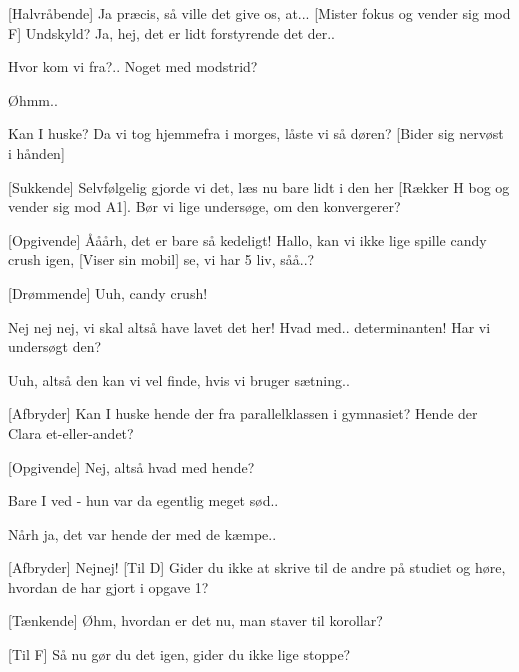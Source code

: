 \documentclass[a4paper,11pt]{article}
\begin{document}
\begin{sketch}
[Halvråbende] Ja præcis, så ville det give os, at... [Mister fokus og vender sig mod F] Undskyld? Ja, hej, det er lidt forstyrende det der..


 Hvor kom vi fra?.. Noget med modstrid?

 Øhmm..


 Kan I huske? Da vi tog hjemmefra i morges, låste vi så døren? [Bider sig nervøst i hånden]

[Sukkende] Selvfølgelig gjorde vi det, læs nu bare lidt i den her [Rækker H bog og vender sig mod A1]. Bør vi lige undersøge, om den konvergerer?

[Opgivende] Ååårh, det er bare så kedeligt! Hallo, kan vi ikke lige spille candy crush igen, [Viser sin mobil] se, vi har 5 liv, såå..?

[Drømmende] Uuh, candy crush!

 Nej nej nej, vi skal altså have lavet det her! Hvad med.. determinanten! Har vi undersøgt den?


 Uuh, altså den kan vi vel finde, hvis vi bruger sætning..

[Afbryder] Kan I huske hende der fra parallelklassen i gymnasiet? Hende der Clara et-eller-andet?

[Opgivende] Nej, altså hvad med hende?

 Bare I ved - hun var da egentlig meget sød..

 Nårh ja, det var hende der med de kæmpe..

[Afbryder] Nejnej! [Til D] Gider du ikke at skrive til de andre på studiet og høre, hvordan de har gjort i opgave 1?


[Tænkende] Øhm, hvordan er det nu, man staver til korollar?

[Til F] Så nu gør du det igen, gider du ikke lige stoppe?


\end{sketch}
\end{document}
